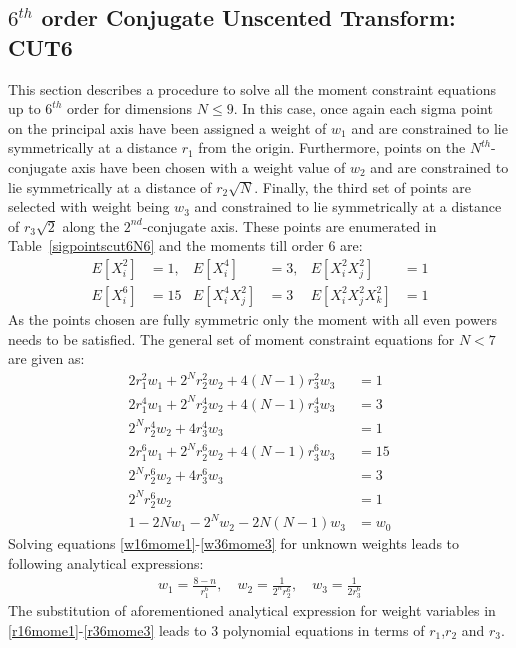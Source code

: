 \documentclass[letterpaper, 10 pt, conference]{IEEEtran}  %
\begin{document}
\subsection{$6^{th}$ order Conjugate Unscented Transform: CUT6}
This section describes a procedure to solve all the moment constraint equations up to $6^{th}$ order for dimensions $N\le9$. In this case, once again each sigma point on the principal axis have been assigned a weight of $w_1$ and are constrained to lie symmetrically at a distance $r_1$ from the origin. Furthermore, points on the $N^{th}$-conjugate axis have been chosen with a weight value of $w_2$ and are constrained to lie symmetrically at a distance of $r_2\sqrt{N}$. Finally, the third set of points are selected with weight being $w_3$ and constrained to lie symmetrically at a distance of $r_3\sqrt{2}$ along the $2^{nd}$-conjugate axis.  These points are enumerated in Table~\ref{sigpointscut6N6} and the moments till order 6 are:
\begin{align}
E[X_i^2]&=1,   &E[X_i^4]&=3,  &E[X_i^2X_j^2]&=1 \nonumber\\
E[X_i^6]&=15   &E[X_i^4X_j^2]&=3 &E[X_i^2X_j^2X_k^2]&=1\label{6thmoms}
\end{align}
As the points chosen are fully symmetric only the moment with all even powers needs to be satisfied. The general set of moment constraint equations for $N<7$ are given as:
\begin{align}
2r_1^2w_1+2^Nr_2^2w_2+4(N-1)r_3^2w_3&=1\label{r16mome1}\\
2r_1^4w_1+2^Nr_2^4w_2+4(N-1)r_3^4w_3&=3\label{r26mome2}\\
2^Nr_2^4w_2+4r_3^4w_3&=1\label{r36mome3}\\
2r_1^6w_1+2^Nr_2^6w_2+4(N-1)r_3^6w_3&=15\label{w16mome1}\\
2^Nr_2^6w_2+4r_3^6w_3&=3\label{w26mome2}\\
2^Nr_2^6w_2&=1\label{w36mome3}\\
1-2Nw_1-2^Nw_2-2N(N-1)w_3&=w_0\label{w06mome3}
\end{align}
Solving equations \eqref{w16mome1}-\eqref{w36mome3} for unknown weights leads to following analytical expressions: 
\begin{align}
w_1=\frac{8-n}{r_1^6},\quad w_2=\frac{1}{2^nr_2^6}, \quad w_3=\frac{1}{2r_3^6}
\end{align}
The substitution of aforementioned analytical expression for weight variables in \eqref{r16mome1}-\eqref{r36mome3} leads to  3 polynomial equations in terms of $r_1$,$r_2$ and $r_3$. 
\end{document}
